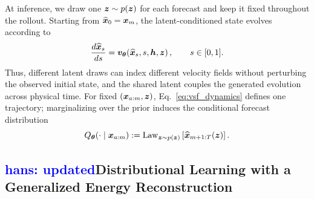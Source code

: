 \documentclass{article} %
\numberwithin{equation}{section}
\newcommand{\hans}[1]{\textcolor{blue}{hans: #1}}
\begin{document}
At inference, we draw one ${\bm{z}}\sim p({\bm{z}})$ for each forecast and keep it
fixed throughout the rollout. Starting from $\widehat{{\bm{x}}}_0={\bm{x}}_m$, the
latent-conditioned state evolves according to
\begin{equation}
    \frac{d\widehat{{\bm{x}}}_s}{ds}
    =
    {\bm{v}}_{{\bm{\theta}}}\!\left(
        \widehat{{\bm{x}}}_s,s,{\bm{h}},{\bm{z}}
    \right),
    \qquad s\in[0,1].
    \label{eq:vsf_dynamics}
\end{equation}
Thus, different latent draws can index different velocity fields without
perturbing the observed initial state, and the shared latent couples the
generated evolution across physical time. For fixed $({\bm{x}}_{a:m},{\bm{z}})$,
Eq.~\ref{eq:vsf_dynamics} defines one trajectory; marginalizing over the
prior induces the conditional forecast distribution
\begin{equation}
    Q_{{\bm{\theta}}}(\cdot\mid{\bm{x}}_{a:m})
    :=
    \operatorname{Law}_{{\bm{z}}\sim p({\bm{z}})}
    \left[
        \widehat{{\bm{x}}}_{m+1:T}({\bm{z}})
    \right].
    \label{Eq:vsf_predictive_distribution}
\end{equation}

\subsection{\hans{updated}Distributional Learning with a Generalized Energy Reconstruction}
\label{sec:vsf-learning}
\end{document}
